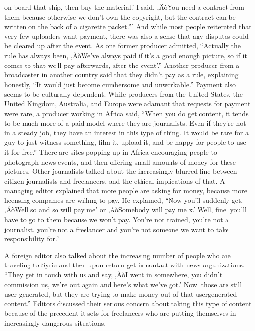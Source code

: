 \documentclass[symmetric, notoc, nobib]{towcenter-book}
\begin{document}
on board that ship, then buy the material.' I said, ‚ÄòYou need a contract from
them because otherwise we don't own the copyright, but the contract can
be written on the back of a cigarette packet.'''
And while most people reiterated that very few uploaders want payment,
there was also a sense that any disputes could be cleared up after the event.
As one former producer admitted, ``Actually the rule has always been, ‚ÄòWe've
always paid if it's a good enough picture, so if it comes to that we'll pay afterwards,
after the event'.''
Another producer from a broadcaster in another country said that they
didn't pay as a rule, explaining honestly, ``It would just become cumbersome
and unworkable.''
Payment also seems to be culturally dependent. While producers from the
United States, the United Kingdom, Australia, and Europe were adamant
that requests for payment were rare, a producer working in Africa said,
``When you do get content, it tends to be much more of a paid model where
they are journalists. Even if they're not in a steady job, they have an interest
in this type of thing. It would be rare for a guy to just witness something,
film it, upload it, and be happy for people to use it for free.'' There are sites
popping up in Africa encouraging people to photograph news events, and
then offering small amounts of money for these pictures.
Other journalists talked about the increasingly blurred line between citizen
journalists and freelancers, and the ethical implications of that. A managing
editor explained that more people are asking for money, because more
licensing companies are willing to pay. He explained, ``Now you'll suddenly
get, ‚ÄòWell so and so will pay me' or ‚ÄòSomebody will pay me x.' Well, fine,
you'll have to go to them because we won't pay. You're not trained, you're
not a journalist, you're not a freelancer and you're not someone we want to
take responsibility for.''

A foreign editor also talked about the increasing number of people who are
traveling to Syria and then upon return get in contact with news organizations.
``They get in touch with us and say, ‚ÄòI went in somewhere, you didn't
commission us, we're out again and here's what we've got.' Now, those are
still user-generated, but they are trying to make money out of that usergenerated
content.'' Editors discussed their serious concern about taking
this type of content because of the precedent it sets for freelancers who are
putting themselves in increasingly dangerous situations.
\end{document}
